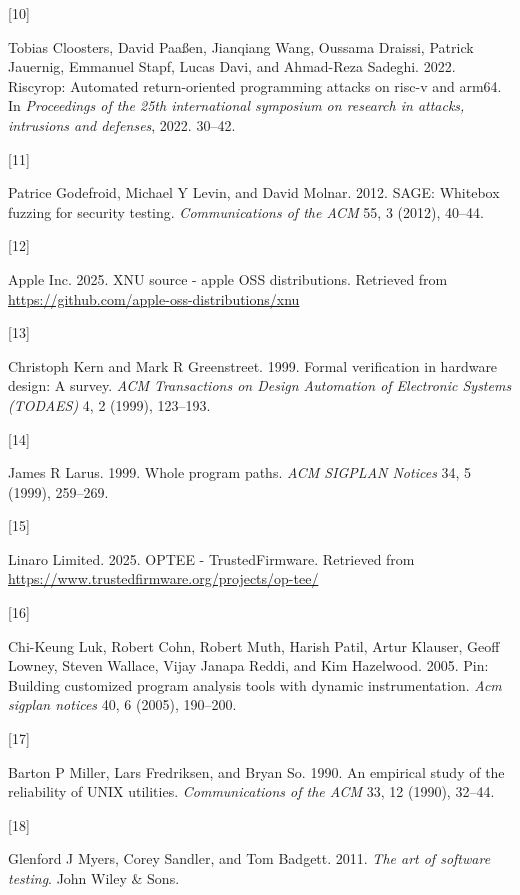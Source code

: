 \documentclass[a4paper, nobind]{templates/ociamthesis}
\newlength{\cslhangindent}
\newlength{\csllabelwidth}
\newenvironment{CSLReferences}[2] %
{\begin{list}{}{%
	\setlength{\itemindent}{0pt}
	\setlength{\leftmargin}{0pt}
	\setlength{\parsep}{0pt}
	\ifodd #1
	\setlength{\leftmargin}{\cslhangindent}
	\setlength{\itemindent}{-1\cslhangindent}
	\fi
	\setlength{\itemsep}{#2\baselineskip}}}
{\end{list}}
\newcommand{\CSLLeftMargin}[1]{\parbox[t]{\csllabelwidth}{\strut#1\strut}}
\newcommand{\CSLRightInline}[1]{\parbox[t]{\linewidth - \csllabelwidth}{\strut#1\strut}}
\begin{document}
\begin{CSLReferences}{0}{0}
\CSLLeftMargin{{[}10{]} }%
\CSLRightInline{Tobias Cloosters, David Paaßen, Jianqiang Wang, Oussama Draissi, Patrick Jauernig, Emmanuel Stapf, Lucas Davi, and Ahmad-Reza Sadeghi. 2022. Riscyrop: Automated return-oriented programming attacks on risc-v and arm64. In \emph{Proceedings of the 25th international symposium on research in attacks, intrusions and defenses}, 2022. 30--42.}

\CSLLeftMargin{{[}11{]} }%
\CSLRightInline{Patrice Godefroid, Michael Y Levin, and David Molnar. 2012. SAGE: Whitebox fuzzing for security testing. \emph{Communications of the ACM} 55, 3 (2012), 40--44.}

\CSLLeftMargin{{[}12{]} }%
\CSLRightInline{Apple Inc. 2025. XNU source - apple OSS distributions. Retrieved from \url{https://github.com/apple-oss-distributions/xnu}}

\CSLLeftMargin{{[}13{]} }%
\CSLRightInline{Christoph Kern and Mark R Greenstreet. 1999. Formal verification in hardware design: A survey. \emph{ACM Transactions on Design Automation of Electronic Systems (TODAES)} 4, 2 (1999), 123--193.}

\CSLLeftMargin{{[}14{]} }%
\CSLRightInline{James R Larus. 1999. Whole program paths. \emph{ACM SIGPLAN Notices} 34, 5 (1999), 259--269.}

\CSLLeftMargin{{[}15{]} }%
\CSLRightInline{Linaro Limited. 2025. OPTEE - TrustedFirmware. Retrieved from \url{https://www.trustedfirmware.org/projects/op-tee/}}

\CSLLeftMargin{{[}16{]} }%
\CSLRightInline{Chi-Keung Luk, Robert Cohn, Robert Muth, Harish Patil, Artur Klauser, Geoff Lowney, Steven Wallace, Vijay Janapa Reddi, and Kim Hazelwood. 2005. Pin: Building customized program analysis tools with dynamic instrumentation. \emph{Acm sigplan notices} 40, 6 (2005), 190--200.}

\CSLLeftMargin{{[}17{]} }%
\CSLRightInline{Barton P Miller, Lars Fredriksen, and Bryan So. 1990. An empirical study of the reliability of UNIX utilities. \emph{Communications of the ACM} 33, 12 (1990), 32--44.}

\CSLLeftMargin{{[}18{]} }%
\CSLRightInline{Glenford J Myers, Corey Sandler, and Tom Badgett. 2011. \emph{The art of software testing}. John Wiley \& Sons.}


\end{CSLReferences}
\end{document}
